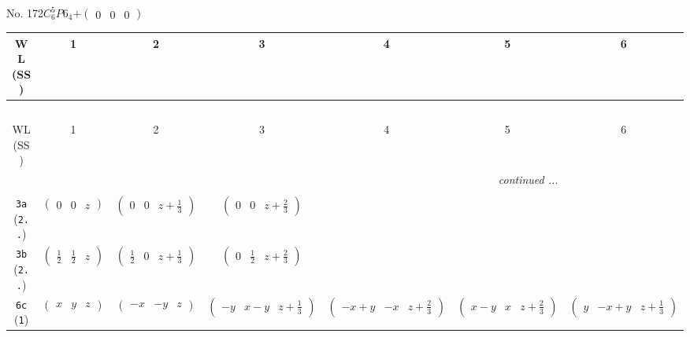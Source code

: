 \documentclass[fleqn,9pt,landscape]{jsarticle}
\begin{document}
\newpage
No. 172\quad$C_{6}^{5}$\quad$P6_4$\quad[ hexagonal ]\quad$+\begin{pmatrix} 0 & 0 & 0 \end{pmatrix}$
\begin{center}
\renewcommand{\arraystretch}{1.2}
\begin{longtable}{ccccccc}
 \hline \hline
WL (SS) & 1 & 2 & 3 & 4 & 5 & 6 \\ \hline \endfirsthead

\multicolumn{6}{l}{\tablename\ \thetable{}} \\
 \hline \hline
WL (SS) & 1 & 2 & 3 & 4 & 5 & 6 \\ \hline \endhead

 \hline \hline
\multicolumn{6}{r}{\footnotesize\it continued ...} \\ \endfoot

 \hline \hline
\multicolumn{6}{r}{} \\ \endlastfoot

{\tt 3a} ({\tt 2..}) & $ \begin{pmatrix} 0 & 0 & z \end{pmatrix} $ & $ \begin{pmatrix} 0 & 0 & z + \frac{1}{3} \end{pmatrix} $ & $ \begin{pmatrix} 0 & 0 & z + \frac{2}{3} \end{pmatrix} $ & $  $ & $  $ & $  $ \\ \hline
{\tt 3b} ({\tt 2..}) & $ \begin{pmatrix} \frac{1}{2} & \frac{1}{2} & z \end{pmatrix} $ & $ \begin{pmatrix} \frac{1}{2} & 0 & z + \frac{1}{3} \end{pmatrix} $ & $ \begin{pmatrix} 0 & \frac{1}{2} & z + \frac{2}{3} \end{pmatrix} $ & $  $ & $  $ & $  $ \\ \hline
{\tt 6c} ({\tt 1}) & $ \begin{pmatrix} x & y & z \end{pmatrix} $ & $ \begin{pmatrix} - x & - y & z \end{pmatrix} $ & $ \begin{pmatrix} - y & x - y & z + \frac{1}{3} \end{pmatrix} $ & $ \begin{pmatrix} - x + y & - x & z + \frac{2}{3} \end{pmatrix} $ & $ \begin{pmatrix} x - y & x & z + \frac{2}{3} \end{pmatrix} $ & $ \begin{pmatrix} y & - x + y & z + \frac{1}{3} \end{pmatrix} $ \\
\end{longtable}
\end{center}
\end{document}
